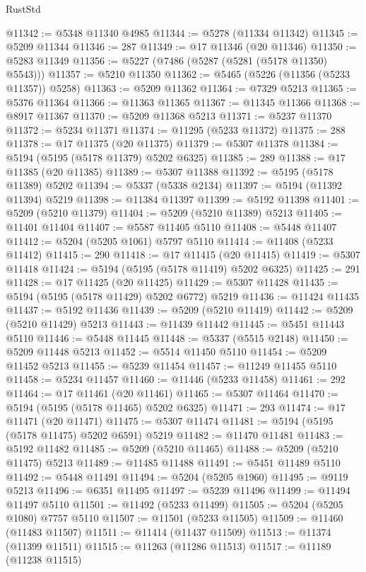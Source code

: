 \begin{lexlean}{RustStd}
\begin{coremodule}
@11342 := @5348 @11340 @4985
@11344 := @5278 (@11334 @11342)
@11345 := @5209 @11344
@11346 := 287
@11349 := @17 @11346 (@20 @11346)
@11350 := @5283 @11349
@11356 := @5227 (@7486 (@5287 (@5281 (@5178 @11350) @5543)))
@11357 := @5210 @11350
@11362 := @5465 (@5226 (@11356 (@5233 @11357)) @5258)
@11363 := @5209 @11362
@11364 := @7329 @5213
@11365 := @5376 @11364
@11366 := @11363 @11365
@11367 := @11345 @11366
@11368 := @8917 @11367
@11370 := @5209 @11368 @5213
@11371 := @5237 @11370
@11372 := @5234 @11371
@11374 := @11295 (@5233 @11372)
@11375 := 288
@11378 := @17 @11375 (@20 @11375)
@11379 := @5307 @11378
@11384 := @5194 (@5195 (@5178 @11379) @5202 @6325)
@11385 := 289
@11388 := @17 @11385 (@20 @11385)
@11389 := @5307 @11388
@11392 := @5195 (@5178 @11389) @5202
@11394 := @5337 (@5338 @2134)
@11397 := @5194 (@11392 @11394) @5219
@11398 := @11384 @11397
@11399 := @5192 @11398
@11401 := @5209 (@5210 @11379)
@11404 := @5209 (@5210 @11389) @5213
@11405 := @11401 @11404
@11407 := @5587 @11405 @5110
@11408 := @5448 @11407
@11412 := @5204 (@5205 @1061) @5797 @5110
@11414 := @11408 (@5233 @11412)
@11415 := 290
@11418 := @17 @11415 (@20 @11415)
@11419 := @5307 @11418
@11424 := @5194 (@5195 (@5178 @11419) @5202 @6325)
@11425 := 291
@11428 := @17 @11425 (@20 @11425)
@11429 := @5307 @11428
@11435 := @5194 (@5195 (@5178 @11429) @5202 @6772) @5219
@11436 := @11424 @11435
@11437 := @5192 @11436
@11439 := @5209 (@5210 @11419)
@11442 := @5209 (@5210 @11429) @5213
@11443 := @11439 @11442
@11445 := @5451 @11443 @5110
@11446 := @5448 @11445
@11448 := @5337 (@5515 @2148)
@11450 := @5209 @11448 @5213
@11452 := @5514 @11450 @5110
@11454 := @5209 @11452 @5213
@11455 := @5239 @11454
@11457 := @11249 @11455 @5110
@11458 := @5234 @11457
@11460 := @11446 (@5233 @11458)
@11461 := 292
@11464 := @17 @11461 (@20 @11461)
@11465 := @5307 @11464
@11470 := @5194 (@5195 (@5178 @11465) @5202 @6325)
@11471 := 293
@11474 := @17 @11471 (@20 @11471)
@11475 := @5307 @11474
@11481 := @5194 (@5195 (@5178 @11475) @5202 @6591) @5219
@11482 := @11470 @11481
@11483 := @5192 @11482
@11485 := @5209 (@5210 @11465)
@11488 := @5209 (@5210 @11475) @5213
@11489 := @11485 @11488
@11491 := @5451 @11489 @5110
@11492 := @5448 @11491
@11494 := @5204 (@5205 @1960)
@11495 := @9119 @5213
@11496 := @6351 @11495
@11497 := @5239 @11496
@11499 := @11494 @11497 @5110
@11501 := @11492 (@5233 @11499)
@11505 := @5204 (@5205 @1080) @7757 @5110
@11507 := @11501 (@5233 @11505)
@11509 := @11460 (@11483 @11507)
@11511 := @11414 (@11437 @11509)
@11513 := @11374 (@11399 @11511)
@11515 := @11263 (@11286 @11513)
@11517 := @11189 (@11238 @11515)

\end{coremodule}
\end{lexlean}
